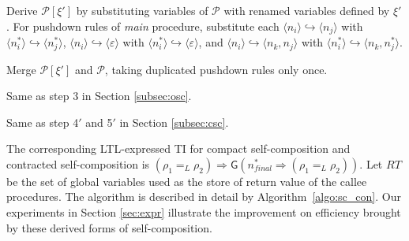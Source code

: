 \documentclass{llncs}
\begin{document}
\begin{compactenum}
\item Derive $\mathcal{P}[\xi']$ by substituting variables of
$\mathcal{P}$ with renamed variables defined by $\xi'$. For pushdown
rules of \emph{main} procedure, substitute each $\langle n_i\rangle
\hookrightarrow \langle n_j\rangle$ with $\langle n_i^*\rangle
\hookrightarrow \langle n_j^*\rangle$, $\langle n_i\rangle
\hookrightarrow \langle \varepsilon\rangle$ with $\langle
n_i^*\rangle \hookrightarrow \langle \varepsilon\rangle$, and
$\langle n_i\rangle \hookrightarrow \langle n_k,n_j\rangle$ with
$\langle n_i^*\rangle \hookrightarrow \langle n_k,n_j^*\rangle$.
\item Merge $\mathcal{P}[\xi']$ and $\mathcal{P}$, taking duplicated
pushdown rules only once.
\item Same as step 3 in Section \ref{subsec:osc}.
\item Same as step 4$'$ and 5$'$ in Section \ref{subsec:csc}.
\end{compactenum}
\indent The corresponding LTL-expressed TI for compact
self-composition and contracted self-composition is $(\rho_1 =_L
\rho_2)\Rightarrow \textsf{G}(n_{final}^*\Rightarrow (\rho_1 =_L
\rho_2))$. Let $RT$ be the set of global variables used as the store
of return value of the callee procedures. The algorithm is described
in detail by Algorithm~\ref{algo:sc_con}. Our experiments in Section
\ref{sec:expr} illustrate the improvement on efficiency brought by
these derived forms of self-composition.
\end{document}
